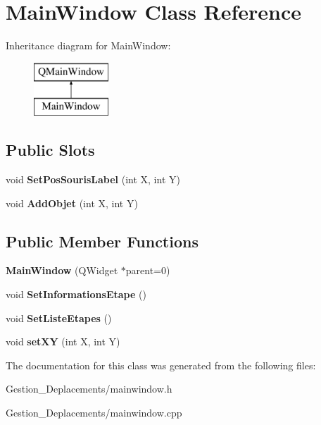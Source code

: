 \section{Main\-Window Class Reference}
\label{class_main_window}
Inheritance diagram for Main\-Window\-:\begin{figure}[H]
\begin{center}
\leavevmode
\includegraphics[height=2.000000cm]{class_main_window}
\end{center}
\end{figure}
\subsection*{Public Slots}
\begin{DoxyCompactItemize}
\item 
void {\bfseries Set\-Pos\-Souris\-Label} (int X, int Y)\label{class_main_window_afa42355eca5129bb79f26b363e18c596}

\item 
void {\bfseries Add\-Objet} (int X, int Y)\label{class_main_window_a63519d0197921f0b2865d9bfa877ff48}

\end{DoxyCompactItemize}
\subsection*{Public Member Functions}
\begin{DoxyCompactItemize}
\item 
{\bfseries Main\-Window} (Q\-Widget $\ast$parent=0)\label{class_main_window_a8b244be8b7b7db1b08de2a2acb9409db}

\item 
void {\bfseries Set\-Informations\-Etape} ()\label{class_main_window_a681fbce5a1d72f252749de90d1f8de7a}

\item 
void {\bfseries Set\-Liste\-Etapes} ()\label{class_main_window_a513b2ad8b54f69eb57e307a4cd436421}

\item 
void {\bfseries set\-X\-Y} (int X, int Y)\label{class_main_window_ad1ba6178941331412706c0579332dec9}

\end{DoxyCompactItemize}


The documentation for this class was generated from the following files\-:\begin{DoxyCompactItemize}
\item 
Gestion\-\_\-\-Deplacements/mainwindow.\-h\item 
Gestion\-\_\-\-Deplacements/mainwindow.\-cpp\end{DoxyCompactItemize}

